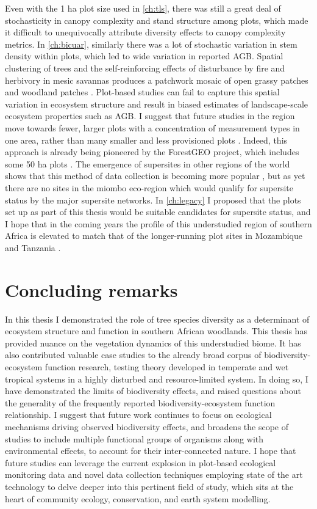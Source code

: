 \begin{refsection}
Even with the 1 ha plot size used in \autoref{ch:tls}, there was still a great deal of stochasticity in canopy complexity and stand structure among plots, which made it difficult to unequivocally attribute diversity effects to canopy complexity metrics. In \autoref{ch:bicuar}, similarly there was a lot of stochastic variation in stem density within plots, which led to wide variation in reported AGB. Spatial clustering of trees and the self-reinforcing effects of disturbance by fire and herbivory in mesic savannas produces a patchwork mosaic of open grassy patches and woodland patches \citep{Staver2011, Schertzer2015}. Plot-based studies can fail to capture this spatial variation in ecosystem structure and result in biased estimates of landscape-scale ecosystem properties such as AGB. I suggest that future studies in the region move towards fewer, larger plots with a concentration of measurement types in one area, rather than many smaller and less provisioned plots \citep{Kreyling2018}. Indeed, this approach is already being pioneered by the ForestGEO project, which includes some 50 ha plots \citep{Davies2021}. The emergence of supersites in other regions of the world shows that this method of data collection is becoming more popular \citep{Schepaschenko2019}, but as yet there are no sites in the miombo eco-region which would qualify for supersite status by the major supersite networks. In \autoref{ch:legacy} I proposed that the plots set up as part of this thesis would be suitable candidates for supersite status, and I hope that in the coming years the profile of this understudied region of southern Africa is elevated to match that of the longer-running plot sites in Mozambique \citep{Ryan2011} and Tanzania \citep{McNicol2018a}.

\section{Concluding remarks}
\label{discussion:sec:conclusion}

In this thesis I demonstrated the role of tree species diversity as a determinant of ecosystem structure and function in southern African woodlands. This thesis has provided nuance on the vegetation dynamics of this understudied biome. It has also contributed valuable case studies to the already broad corpus of biodiversity-ecosystem function research, testing theory developed in temperate and wet tropical systems in a highly disturbed and resource-limited system. In doing so, I have demonstrated the limits of biodiversity effects, and raised questions about the generality of the frequently reported biodiversity-ecosystem function relationship. I suggest that future work continues to focus on ecological mechanisms driving observed biodiversity effects, and broadens the scope of studies to include multiple functional groups of organisms along with environmental effects, to account for their inter-connected nature. I hope that future studies can leverage the current explosion in plot-based ecological monitoring data and novel data collection techniques employing state of the art technology to delve deeper into this pertinent field of study, which sits at the heart of community ecology, conservation, and earth system modelling.


\end{refsection}
